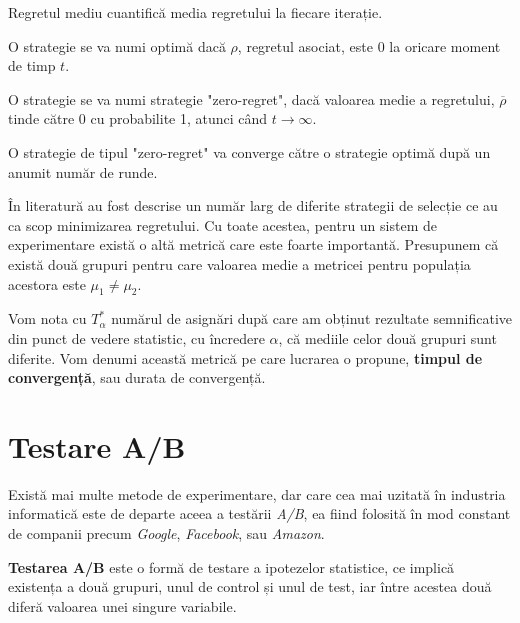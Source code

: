 \begin{remark}
	Regretul mediu cuantifică media regretului la fiecare iterație.
\end{remark}

\begin{definition}
	O strategie se va numi optimă dacă $\rho$, regretul asociat, este 0 la oricare moment de timp $t$.
\end{definition}

\begin{definition}
	O strategie se va numi strategie "zero-regret", dacă valoarea medie a regretului, $\overline{\rho}$ tinde către 0 cu probabilite 1, atunci când $t \to \infty$.
\end{definition}

\begin{remark}
	O strategie de tipul "zero-regret" va converge către o strategie optimă după un anumit număr de runde.
\end{remark}

În literatură au fost descrise un număr larg de diferite strategii de selecție ce au ca scop minimizarea regretului. Cu toate acestea, pentru un sistem de experimentare există o altă metrică care este foarte importantă. Presupunem că există două grupuri pentru care valoarea medie a metricei pentru populația acestora este $\mu_1 \neq \mu_2$.

\begin{definition}
	Vom nota cu $T_{\alpha}^*$ numărul de asignări după care am obținut rezultate semnificative din punct de vedere statistic, cu încredere $\alpha$, că mediile celor două grupuri sunt diferite. Vom denumi această metrică pe care lucrarea o propune, \textbf{timpul de convergență}, sau durata de convergență.
\end{definition}

\section{Testare A/B}

Există mai multe metode de experimentare, dar care cea mai uzitată în industria informatică este de departe aceea a testării \textit{A/B}, ea fiind folosită în mod constant de companii precum \textit{Google}, \textit{Facebook}, sau \textit{Amazon}. 

\begin{definition}
	\textbf{Testarea A/B} este o formă de testare a ipotezelor statistice, ce implică existența a două grupuri, unul de control și unul de test, iar între acestea două diferă valoarea unei singure variabile.
\end{definition}

